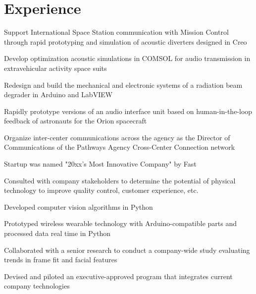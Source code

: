 \documentclass[]{deedy-resume-openfont}
\begin{document}
\begin{minipage}[t]{0.66\textwidth} 


\section{Experience}

\vspace{\topsep} %
\begin{tightemize}
\item Support International Space Station communication with Mission Control through rapid prototyping and simulation of acoustic diverters designed in Creo
\item Develop optimization acoustic simulations in COMSOL for audio transmission in extravehicular activity space suits
\item Redesign and build the mechanical and electronic systems of a radiation beam degrader in Arduino and LabVIEW
\item Rapidly prototype versions of an audio interface unit based on human-in-the-loop feedback of astronauts for the Orion spacecraft
\item Organize inter-center communications across the agency as the Director of Communications of the Pathways Agency Cross-Center Connection network
\end{tightemize}
\sectionsep

\begin{tightemize}
\item Startup was named "20xx's Most Innovative Company" by Fast 
\item Consulted with company stakeholders to determine the potential of physical technology to improve quality control, customer experience, etc.
\item Developed computer vision algorithms in Python 
\item Prototyped wireless wearable technology with Arduino-compatible parts and processed data real time in Python
\item Collaborated with a senior research to conduct a company-wide study evaluating trends in frame fit and facial features
\item Devised and piloted an executive-approved program that integrates current company technologies
\end{tightemize}
\sectionsep


\end{minipage}
\end{document}
